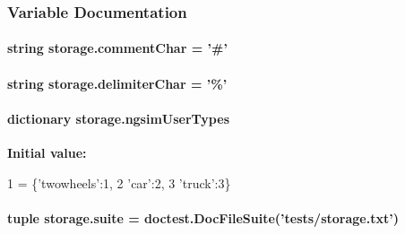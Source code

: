 \subsubsection{Variable Documentation}
\hypertarget{namespacestorage_a18b61e15932e99da07525d41426578f4}{
\paragraph[{comment\-Char}]{\setlength{\rightskip}{0pt plus 5cm}string storage.\-comment\-Char = '\#'}}\label{namespacestorage_a18b61e15932e99da07525d41426578f4}
\hypertarget{namespacestorage_a15f0d1e5c99f18fa1a65ac8bfd5ab6ce}{
\paragraph[{delimiter\-Char}]{\setlength{\rightskip}{0pt plus 5cm}string storage.\-delimiter\-Char = '\%'}}\label{namespacestorage_a15f0d1e5c99f18fa1a65ac8bfd5ab6ce}
\hypertarget{namespacestorage_a617f43c8183448d5942cb9ff673d9f5f}{
\paragraph[{ngsim\-User\-Types}]{\setlength{\rightskip}{0pt plus 5cm}dictionary storage.\-ngsim\-User\-Types}}\label{namespacestorage_a617f43c8183448d5942cb9ff673d9f5f}
{\bfseries Initial value\-:}
\begin{DoxyCode}
1 = \{\textcolor{stringliteral}{'twowheels'}:1,
2                   \textcolor{stringliteral}{'car'}:2,
3                   \textcolor{stringliteral}{'truck'}:3\}
\end{DoxyCode}
\hypertarget{namespacestorage_a49f03962e98375def838e17cf50304b3}{
\paragraph[{suite}]{\setlength{\rightskip}{0pt plus 5cm}tuple storage.\-suite = doctest.\-Doc\-File\-Suite('tests/storage.\-txt')}}\label{namespacestorage_a49f03962e98375def838e17cf50304b3}
